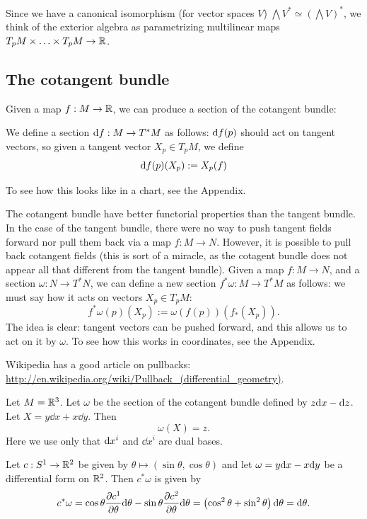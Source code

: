 \documentclass[11pt, english]{article}
\begin{document}
Since we have a canonical isomorphism (for vector spaces $V$) $\bigwedge V^\ast \simeq (\bigwedge V)^\ast$, we think of the exterior algebra as parametrizing multilinear maps $T_pM \times \ldots \times T_pM \to \mathbb{R}$.

\subsection{The cotangent bundle}

Given a map $f:M \to \mathbb{R}$, we can produce a section of the cotangent bundle:
\begin{defi}
We define a section $\mathrm{d}{f}: M \to T^\ast M$ as follows: $\mathrm{d}{f}(p)$ should act on tangent vectors, so given a tangent vector $X_p \in T_pM$, we define \[
\mathrm{d}{f}(p) (X_p) := X_p(f)
\]
\end{defi}
To see how this looks like in a chart, see the Appendix.

The cotangent bundle have better functorial properties than the tangent bundle. In the case of the tangent bundle, there were no way to push tangent fields forward nor pull them back via a map $f:M \to N$. However, it is possible to pull back cotangent fields (this is sort of a miracle, as the cotagent bundle does not appear all that different from the tangent bundle). Given a map $f:M \to N$, and a section $\omega:N \to T^\ast N$, we can define a new section $f^\ast \omega:M \to T^\ast M$ as follows: we must say how it acts on vectors $X_p \in T_pM$:
\[
f^\ast \omega(p)(X_p) := \omega(f(p))(f_\ast(X_p)).
\]
The idea is clear: tangent vectors can be pushed forward, and this allows us to act on it by $\omega$.  To see how this works in coordinates, see the Appendix.

Wikipedia has a good article on pullbacks: \url{http://en.wikipedia.org/wiki/Pullback_(differential_geometry)}. 

\begin{example}
Let $M=\mathbb{R}^3$. Let $\omega$ be the section of the cotangent bundle defined by $z \mathrm{d}{x}-\mathrm{d}{z}$. Let $X=y \dd{}{x}+x \dd{}{y}$. Then 
\[
\omega(X) = z.
\]
Here we use only that $\mathrm{d}{x}^i$ and $\dd{}{x^i}$ are dual bases.
\end{example}

\begin{example}
Let $c:S^1 \to \mathbb{R}^2$ be given by $\theta \mapsto (\sin \theta, \cos \theta)$ and let $\omega = y \mathrm{d}{x} - x \mathrm{d}{y}$ be a differential form on $\mathbb{R}^2$. Then $c^\ast \omega$ is given by
\[
c^\ast \omega = \cos \theta \frac{\partial {c^1}}{\partial {\theta}} \mathrm{d}{\theta} -\sin \theta \frac{\partial {c^2}}{\partial {\theta}} \mathrm{d}{\theta}
 = \left( \cos^2 \theta + \sin^2 \theta  \right) \mathrm{d}{\theta} = \mathrm{d}{\theta}.
\]
\end{example}
\end{document}
